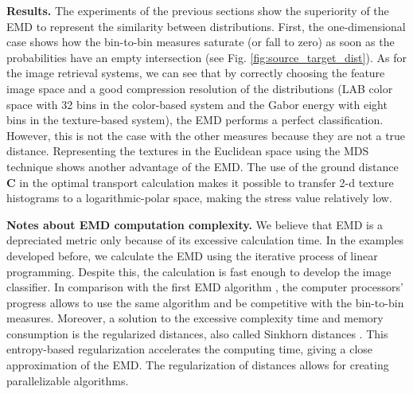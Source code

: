 \textbf{Results.}
The experiments of the previous sections show the superiority of the EMD to represent the similarity between distributions. First, the one-dimensional case shows how the bin-to-bin measures saturate (or fall to zero) as soon as the probabilities have an empty intersection (see Fig. \ref{fig:source_target_dist}). As for the image retrieval systems, we can see that by correctly choosing the feature image space and a good compression resolution of the distributions (LAB color space with 32 bins in the color-based system and the Gabor energy with eight bins in the texture-based system), the EMD performs a perfect classification. However, this is not the case with the other measures because they are not a true distance. Representing the textures in the Euclidean space using the MDS technique shows another advantage of the EMD. The use of the ground distance $\textbf{C}$ in the optimal transport calculation makes it possible to transfer 2-d texture histograms to a logarithmic-polar space, making the stress value relatively low. 


\textbf{Notes about EMD computation complexity.}
We believe that EMD is a depreciated metric only because of its excessive calculation time. In the examples developed before, we calculate the EMD using the iterative process of linear programming. Despite this, the calculation is fast enough to develop the image classifier. In comparison with the first EMD algorithm \citep{Rubner.Tomasi.ea:IJCV:2000}, the computer processors' progress allows to use the same algorithm and be competitive with the bin-to-bin measures. Moreover, a solution to the excessive complexity time and memory consumption is the regularized distances, also called Sinkhorn distances \citep{Cuturi:NIPS:2013}. This entropy-based regularization accelerates the computing time, giving a close approximation of the EMD. The regularization of distances allows for creating parallelizable algorithms.